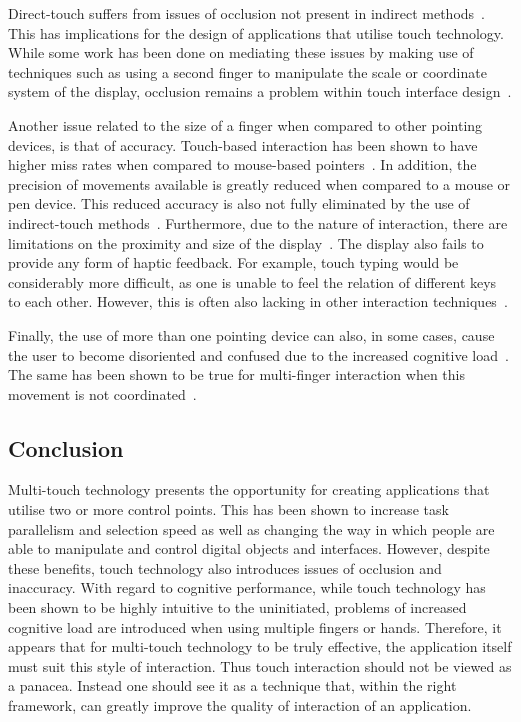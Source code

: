 Direct-touch suffers from issues of occlusion not present in indirect methods~\citep{Wu03}. This has implications for the design of applications that utilise touch technology. While some work has been done on mediating these issues by making use of techniques such as using a second finger to manipulate the scale or coordinate system of the display, occlusion remains a problem within touch interface design~\citep{Mosc08}.

Another issue related to the size of a finger when compared to other pointing devices, is that of accuracy. Touch-based interaction has been shown to have higher miss rates when compared to mouse-based pointers~\citep{Mosc08}. In addition, the precision of movements available is greatly reduced when compared to a mouse or pen device. This reduced accuracy is also not fully eliminated by the use of indirect-touch methods~\citep{MoscH06}. Furthermore, due to the nature of interaction, there are limitations on the proximity and size of the display~\citep{Mosc08}. The display also fails to provide any form of haptic feedback. For example, touch typing would be considerably more difficult, as one is unable to feel the relation of different keys to each other. However, this is often also lacking in other interaction techniques~\citep{Wobb09}.

Finally, the use of more than one pointing device can also, in some cases, cause the user to become disoriented and confused due to the increased cognitive load~\citep{Mosc08}. The same has been shown to be true for multi-finger interaction when this movement is not coordinated~\citep{Kin09}.

\subsection{Conclusion}
Multi-touch technology presents the opportunity for creating applications that utilise two or more control points. This has been shown to increase task parallelism and selection speed as well as changing the way in which people are able to manipulate and control digital objects and interfaces. However, despite these benefits, touch technology also introduces issues of occlusion and inaccuracy. With regard to cognitive performance, while touch technology has been shown to be highly intuitive to the uninitiated, problems of increased cognitive load are introduced when using multiple fingers or hands. Therefore, it appears that for multi-touch technology to be truly effective, the application itself must suit this style of interaction. Thus touch interaction should not be viewed as a panacea. Instead one should see it as a technique that, within the right framework, can greatly improve the quality of interaction of an application.


